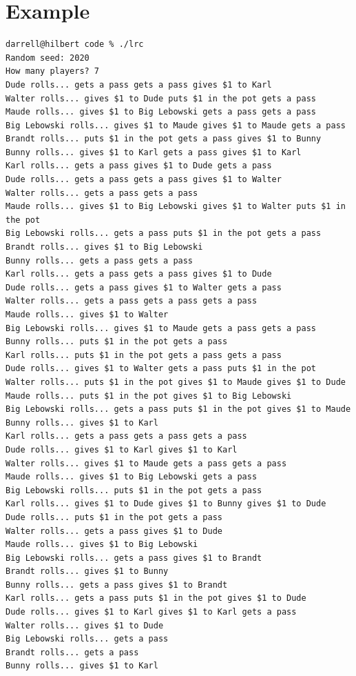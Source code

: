 \documentclass{article}
\begin{document}
\section*{Example}
\begin{verbatim}
darrell@hilbert code % ./lrc
Random seed: 2020
How many players? 7
Dude rolls... gets a pass gets a pass gives $1 to Karl 
Walter rolls... gives $1 to Dude puts $1 in the pot gets a pass 
Maude rolls... gives $1 to Big Lebowski gets a pass gets a pass 
Big Lebowski rolls... gives $1 to Maude gives $1 to Maude gets a pass 
Brandt rolls... puts $1 in the pot gets a pass gives $1 to Bunny 
Bunny rolls... gives $1 to Karl gets a pass gives $1 to Karl 
Karl rolls... gets a pass gives $1 to Dude gets a pass 
Dude rolls... gets a pass gets a pass gives $1 to Walter 
Walter rolls... gets a pass gets a pass 
Maude rolls... gives $1 to Big Lebowski gives $1 to Walter puts $1 in the pot 
Big Lebowski rolls... gets a pass puts $1 in the pot gets a pass 
Brandt rolls... gives $1 to Big Lebowski 
Bunny rolls... gets a pass gets a pass 
Karl rolls... gets a pass gets a pass gives $1 to Dude 
Dude rolls... gets a pass gives $1 to Walter gets a pass 
Walter rolls... gets a pass gets a pass gets a pass 
Maude rolls... gives $1 to Walter 
Big Lebowski rolls... gives $1 to Maude gets a pass gets a pass 
Bunny rolls... puts $1 in the pot gets a pass 
Karl rolls... puts $1 in the pot gets a pass gets a pass 
Dude rolls... gives $1 to Walter gets a pass puts $1 in the pot 
Walter rolls... puts $1 in the pot gives $1 to Maude gives $1 to Dude 
Maude rolls... puts $1 in the pot gives $1 to Big Lebowski 
Big Lebowski rolls... gets a pass puts $1 in the pot gives $1 to Maude 
Bunny rolls... gives $1 to Karl 
Karl rolls... gets a pass gets a pass gets a pass 
Dude rolls... gives $1 to Karl gives $1 to Karl 
Walter rolls... gives $1 to Maude gets a pass gets a pass 
Maude rolls... gives $1 to Big Lebowski gets a pass 
Big Lebowski rolls... puts $1 in the pot gets a pass 
Karl rolls... gives $1 to Dude gives $1 to Bunny gives $1 to Dude 
Dude rolls... puts $1 in the pot gets a pass 
Walter rolls... gets a pass gives $1 to Dude 
Maude rolls... gives $1 to Big Lebowski 
Big Lebowski rolls... gets a pass gives $1 to Brandt 
Brandt rolls... gives $1 to Bunny 
Bunny rolls... gets a pass gives $1 to Brandt 
Karl rolls... gets a pass puts $1 in the pot gives $1 to Dude 
Dude rolls... gives $1 to Karl gives $1 to Karl gets a pass 
Walter rolls... gives $1 to Dude 
Big Lebowski rolls... gets a pass 
Brandt rolls... gets a pass 
Bunny rolls... gives $1 to Karl 

\end{verbatim}
\end{document}
